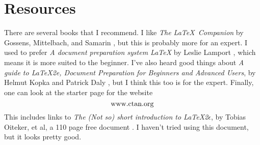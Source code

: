 \section{Resources}

There are several books that I recommend.  I like {\it The \LaTeX\
Companion} by Gossens, Mittelbach, and Samarin \cite{G}, but this
is probably more for an expert. I used to prefer {\it A document
preparation system \LaTeX} by Leslie Lamport \cite{L}, which means
it is more suited to the beginner. I've also heard good things
about {\it A guide to \LaTeX2e, Document Preparation for Beginners
and Advanced Users}, by Helmut Kopka and Patrick Daly \cite{K-D},
but I think this too is for the expert. Finally, one can look at
the starter page for the website
\[
\hbox{www.ctan.org}
\]
This includes links to {\it The (Not so) short introduction to
\LaTeX2$\epsilon$}, by Tobias Oiteker, et al, a 110 page free
document \cite{O}. I haven't tried using this document, but it
looks pretty good.
